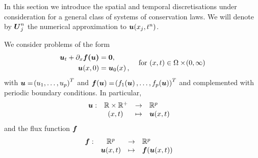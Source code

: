 \documentclass[final]{amsart}
\renewcommand{\dfunkmapsto}[5]{\ensuremath{
		\begin{array}{rccl}
			{#1}: & {#2} &\to&{#3}
			\\
			& {#4} &\mapsto&{#5}
		\end{array}\quad}}
\renewcommand{\vect}[1]{\geovec{#1}}
\renewcommand{\vec}[1]{\geovec{#1}}
\numberwithin{equation}{section}
\begin{document}
In this section we introduce the spatial and temporal discretisations
under consideration for a general class of systems of conservation
laws.  We will denote by $\vec{U}^n_j$ the numerical approximation to
$\vec u\qp{x_j, t^n}$.
\begin{Rem} We consider problems of the form
	\begin{equation}\label{eq_1d_gen_cons_law}
	\begin{aligned}
	\vect{u}_t+\partial_x\vect{f\qp{\vect{u}}}&=\vect{0},\\
	\vect{u}\qp{x,0}&=\vect{u}_0\qp{x},
	\end{aligned}\quad \text{ for } \qp{x,t}\in \W\times\qp{0,\infty}
	\end{equation}
	with $\vect{u}=\qp{u_1,\dots,u_p}^T$ and $\vect{f}\qp{\vect{u}}=\qp{f_1\qp{\vect{u}},\dots,f_p\qp{\vect{u}}}^T$ and complemented with periodic boundary conditions.
	In particular,
	\begin{equation}
	\dfunkmapsto{\vec{u}}{\mathbb{R}\times\mathbb{R}^+}{\mathbb{R}^p}{\qp{x,t}}{\vect{u}\qp{x,t}}
	\end{equation}
	and the flux function $\vect{f}$
	\begin{equation}
	\dfunkmapsto{\vec{f}}{\mathbb{R}^p}{\mathbb{R}^p}{\vect{u}\qp{x,t}}{\vect{f}\qp{\vect{u}\qp{x,t}}}
	\end{equation}
\end{Rem}
\end{document}
